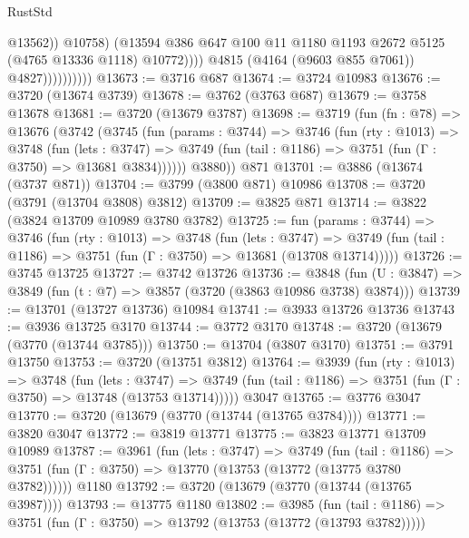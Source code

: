 \begin{lexlean}{RustStd}
\begin{coremodule}
                                    @13562))
                                @10758)
                              (@13594
                                @386
                                @647
                                @100
                                @11
                                @1180
                                @1193
                                @2672
                                @5125
                                (@4765 @13336 @1118)
                                @10772))))
                        @4815
                        (@4164 (@9603 @855 @7061))
                        @4827))))))))))
@13673 := @3716 @687
@13674 := @3724 @10983
@13676 := @3720 (@13674 @3739)
@13678 := @3762 (@3763 @687)
@13679 := @3758 @13678
@13681 := @3720 (@13679 @3787)
@13698 := @3719
    (fun (fn : @78) =>
    @13676
      (@3742
        (@3745
          (fun (params : @3744) =>
          @3746
            (fun (rty : @1013) =>
            @3748
              (fun (lets : @3747) =>
              @3749 (fun (tail : @1186) => @3751 (fun (Γ : @3750) => @13681 @3834))))))
        @3880))
    @871
@13701 := @3886 (@13674 (@3737 @871))
@13704 := @3799 (@3800 @871) @10986
@13708 := @3720 (@3791 (@13704 @3808) @3812)
@13709 := @3825 @871
@13714 := @3822 (@3824 @13709 @10989 @3780 @3782)
@13725 := fun (params : @3744) =>
  @3746
    (fun (rty : @1013) =>
    @3748
      (fun (lets : @3747) =>
      @3749 (fun (tail : @1186) => @3751 (fun (Γ : @3750) => @13681 (@13708 @13714)))))
@13726 := @3745 @13725
@13727 := @3742 @13726
@13736 := @3848
    (fun (U : @3847) => @3849 (fun (t : @7) => @3857 (@3720 (@3863 @10986 @3738) @3874)))
@13739 := @13701 (@13727 @13736) @10984
@13741 := @3933 @13726 @13736
@13743 := @3936 @13725 @3170
@13744 := @3772 @3170
@13748 := @3720 (@13679 (@3770 (@13744 @3785)))
@13750 := @13704 (@3807 @3170)
@13751 := @3791 @13750
@13753 := @3720 (@13751 @3812)
@13764 := @3939
    (fun (rty : @1013) =>
    @3748
      (fun (lets : @3747) =>
      @3749 (fun (tail : @1186) => @3751 (fun (Γ : @3750) => @13748 (@13753 @13714)))))
    @3047
@13765 := @3776 @3047
@13770 := @3720 (@13679 (@3770 (@13744 (@13765 @3784))))
@13771 := @3820 @3047
@13772 := @3819 @13771
@13775 := @3823 @13771 @13709 @10989
@13787 := @3961
    (fun (lets : @3747) =>
    @3749
      (fun (tail : @1186) =>
      @3751 (fun (Γ : @3750) => @13770 (@13753 (@13772 (@13775 @3780 @3782))))))
    @1180
@13792 := @3720 (@13679 (@3770 (@13744 (@13765 @3987))))
@13793 := @13775 @1180
@13802 := @3985
    (fun (tail : @1186) => @3751 (fun (Γ : @3750) => @13792 (@13753 (@13772 (@13793 @3782)))))

\end{coremodule}
\end{lexlean}
